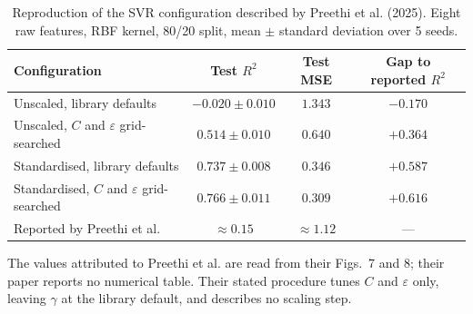 \begin{table}[htbp]
\centering
\caption{Reproduction of the SVR configuration described by Preethi et al. (2025). Eight raw features, RBF kernel, 80/20 split, mean $\pm$ standard deviation over 5 seeds.}\label{tab:reproduction}
\small
\begin{tabular}{lccc}
\toprule
Configuration & Test $R^2$ & Test MSE & Gap to reported $R^2$ \\
\midrule
Unscaled, library defaults & $-0.020 \pm 0.010$ & $1.343$ & $-0.170$ \\
Unscaled, $C$ and $\varepsilon$ grid-searched & $0.514 \pm 0.010$ & $0.640$ & $+0.364$ \\
Standardised, library defaults & $0.737 \pm 0.008$ & $0.346$ & $+0.587$ \\
Standardised, $C$ and $\varepsilon$ grid-searched & $0.766 \pm 0.011$ & $0.309$ & $+0.616$ \\
\midrule Reported by Preethi et al. & $\approx 0.15$ & $\approx 1.12$ & --- \\
\bottomrule
\end{tabular}
\begin{flushleft}\footnotesize The values attributed to Preethi et al. are read from their Figs.~7 and 8; their paper reports no numerical table. Their stated procedure tunes $C$ and $\varepsilon$ only, leaving $\gamma$ at the library default, and describes no scaling step.\end{flushleft}
\end{table}